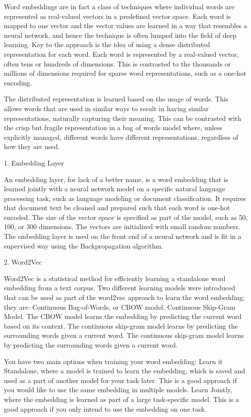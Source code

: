 Word embeddings are in fact a class of techniques where individual words are represented as real-valued vectors in a predefined vector space. Each word is mapped to one vector and the vector values are learned in a way that resembles a neural network, and hence the technique is often lumped into the field of deep learning.
Key to the approach is the idea of using a dense distributed representation for each word.
Each word is represented by a real-valued vector, often tens or hundreds of dimensions. This is contrasted to the thousands or millions of dimensions required for sparse word representations, such as a one-hot encoding.

The distributed representation is learned based on the usage of words. This allows words that are used in similar ways to result in having similar representations, naturally capturing their meaning. This can be contrasted with the crisp but fragile representation in a bag of words model where, unless explicitly managed, different words have different representations, regardless of how they are used.

1. Embedding Layer

An embedding layer, for lack of a better name, is a word embedding that is learned jointly with a neural network model on a specific natural language processing task, such as language modeling or document classification.
It requires that document text be cleaned and prepared such that each word is one-hot encoded. The size of the vector space is specified as part of the model, such as 50, 100, or 300 dimensions. The vectors are initialized with small random numbers. The embedding layer is used on the front end of a neural network and is fit in a supervised way using the Backpropagation algorithm.

2. Word2Vec

Word2Vec is a statistical method for efficiently learning a standalone word embedding from a text corpus.
Two different learning models were introduced that can be used as part of the word2vec approach to learn the word embedding; they are:
    Continuous Bag-of-Words, or CBOW model.
    Continuous Skip-Gram Model.
The CBOW model learns the embedding by predicting the current word based on its context. The continuous skip-gram model learns by predicting the surrounding words given a current word.
The continuous skip-gram model learns by predicting the surrounding words given a current word.

You have two main options when training your word embedding:
    Learn it Standalone, where a model is trained to learn the embedding, which is saved and used as a part of another model for your task later. This is a good approach if you would like to use the same embedding in multiple models.
    Learn Jointly, where the embedding is learned as part of a large task-specific model. This is a good approach if you only intend to use the embedding on one task.

